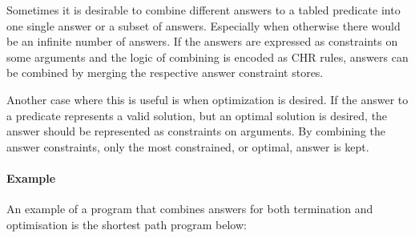 Sometimes it is desirable to combine different answers to a tabled predicate
into one single answer or a subset of answers. Especially when otherwise
there would be an infinite number of answers. If the answers are expressed as
constraints on some arguments and the logic of combining is encoded as CHR
rules, answers can be combined by merging the respective answer constraint
stores.

Another case where this is useful is when optimization is desired. If the
answer to a predicate represents a valid solution, but an optimal solution
is desired, the answer should be represented as constraints on arguments.
By combining the answer constraints, only the most constrained, or optimal,
answer is kept.

\paragraph{Example} 
An example of a program that combines answers for
both termination and optimisation is the shortest path program below:

